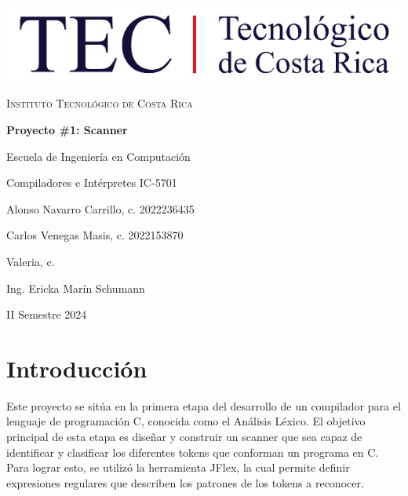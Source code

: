 \documentclass[a4paper,12pt]{article}
\begin{document}
\begin{titlepage}
    \centering
    \vspace*{0.5cm}

    \includegraphics[width=1\textwidth]{logo-tec.png}\par\vspace{1cm}

    {\scshape Instituto Tecnológico de Costa Rica\par}
    \vspace{2cm}

    {\Huge\bfseries Proyecto \#1: Scanner\par}
    \vspace{2cm}

    {\large Escuela de Ingeniería en Computación\par}

    {\large Compiladores e Intérpretes IC-5701\par}
    \vspace{2cm}

    {\large Alonso Navarro Carrillo, c. 2022236435\par}
    \vspace{0.25cm}
    {\large Carlos Venegas Masis, c. 2022153870 \par}
    \vspace{0.25cm}
    {\large Valeria, c. \par}
    \vspace{2cm}

    \vfill

    {\large Ing. Ericka Marín Schumann\par}

    {II Semestre 2024\par}
\end{titlepage}

\tableofcontents\newpage

\section*{Introducción}
\begin{flushleft}
	\hspace*{2em} Este proyecto se sitúa en la primera etapa del desarrollo
de un compilador para el lenguaje de programación C, conocida como el
Análisis Léxico. El objetivo principal de esta etapa es diseñar y construir
un scanner que sea capaz de identificar y clasificar los diferentes tokens
que conforman un programa en C. Para lograr esto, se utilizó la herramienta
JFlex, la cual permite definir expresiones regulares que describen los patrones
de los tokens a reconocer.
\end{flushleft}
\end{document}
